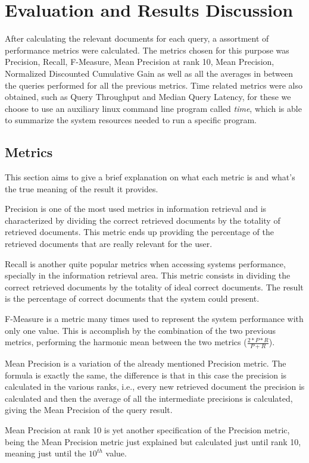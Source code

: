 \documentclass[12pt]{article}
\begin{document}
\section{Evaluation and Results Discussion}
After calculating the relevant documents for each query, a assortment of performance metrics were calculated. The metrics chosen for this purpose was Precision, Recall, F-Measure, Mean Precision at rank 10, Mean Precision, Normalized Discounted Cumulative Gain as well as all the averages in between the queries performed for all the previous metrics. Time related metrics were also obtained, such as Query Throughput and Median Query Latency, for these we choose to use an auxiliary linux command line program called \textit{time}, which is able to summarize the system resources needed to run a specific program.

\subsection{Metrics}
This section aims to give a brief explanation on what each metric is and what's the true meaning of the result it provides.

Precision is one of the most used metrics in information retrieval and is characterized by dividing the correct retrieved documents by the totality of retrieved documents. This metric ends up providing the percentage of the retrieved documents that are really relevant for the user.

Recall is another quite popular metrics when accessing systems performance, specially in the information retrieval area. This metric consists in dividing the correct retrieved documents by the totality of ideal correct documents. The result is the percentage of correct documents that the system could present.

F-Measure is a metric many times used to represent the system performance with only one value. This is accomplish by the combination of the two previous metrics, performing the harmonic mean between the two metrics ($\frac{2*P*R}{P+R}$).

Mean Precision is a variation of the already mentioned Precision metric. The formula is exactly the same, the difference is that in this case the precision is calculated in the various ranks, i.e., every new retrieved document the precision is calculated and then the average of all the intermediate precisions is calculated, giving the Mean Precision of the query result.

Mean Precision at rank 10 is yet another specification of the Precision metric, being the Mean Precision metric just explained but calculated just until rank 10, meaning just until the $10^{th}$ value.
\end{document}
